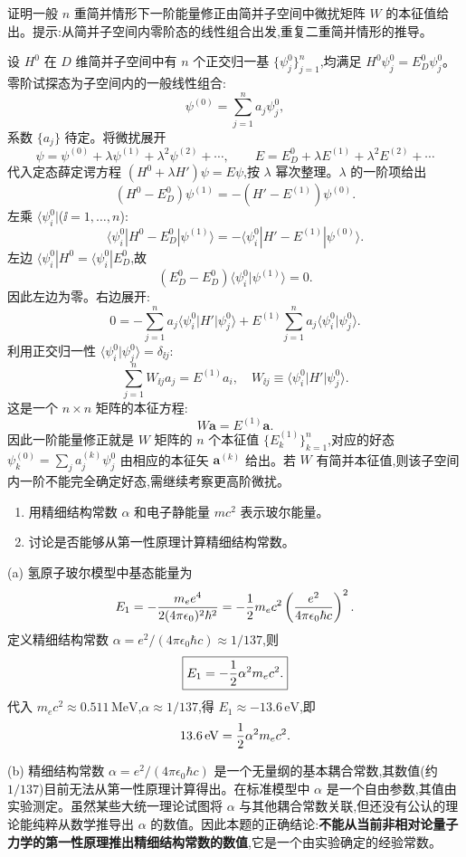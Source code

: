 \begin{question}
证明一般 $n$ 重简并情形下一阶能量修正由简并子空间中微扰矩阵 $W$ 的本征值给出。提示:从简并子空间内零阶态的线性组合出发,重复二重简并情形的推导。
\end{question}
\begin{solution}
设 $H^0$ 在 $D$ 维简并子空间中有 $n$ 个正交归一基 $\{\psi_j^0\}_{j=1}^n$,均满足 $H^0\psi_j^0=E_D^0\psi_j^0$。零阶试探态为子空间内的一般线性组合:
\[
\psi^{(0)}=\sum_{j=1}^n a_j\psi_j^0,
\]
系数 $\{a_j\}$ 待定。将微扰展开
\[
\psi=\psi^{(0)}+\lambda\psi^{(1)}+\lambda^2\psi^{(2)}+\cdots,\qquad
E=E_D^0+\lambda E^{(1)}+\lambda^2 E^{(2)}+\cdots
\]
代入定态薛定谔方程 $(H^0+\lambda H')\psi=E\psi$,按 $\lambda$ 幂次整理。$\lambda$ 的一阶项给出
\[
(H^0-E_D^0)\psi^{(1)}=-(H'-E^{(1)})\psi^{(0)}.
\]
左乘 $\langle\psi_i^0|$($\ii=1,\dots,n$):
\[
\langle\psi_i^0|H^0-E_D^0|\psi^{(1)}\rangle
=-\langle\psi_i^0|H'-E^{(1)}|\psi^{(0)}\rangle.
\]
左边 $\langle\psi_i^0|H^0=\langle\psi_i^0|E_D^0$,故
\[
(E_D^0-E_D^0)\langle\psi_i^0|\psi^{(1)}\rangle=0.
\]
因此左边为零。右边展开:
\[
0=-\sum_{j=1}^n a_j\langle\psi_i^0|H'|\psi_j^0\rangle
+E^{(1)}\sum_{j=1}^n a_j\langle\psi_i^0|\psi_j^0\rangle.
\]
利用正交归一性 $\langle\psi_i^0|\psi_j^0\rangle=\delta_{\ii j}$:
\[
\sum_{j=1}^n W_{\ii j}a_j = E^{(1)}a_i,\quad
W_{\ii j}\equiv\langle\psi_i^0|H'|\psi_j^0\rangle.
\]
这是一个 $n\times n$ 矩阵的本征方程:
\[
W\mathbf a = E^{(1)}\mathbf a.
\]
因此一阶能量修正就是 $W$ 矩阵的 $n$ 个本征值 $\{E_k^{(1)}\}_{k=1}^n$,对应的好态 $\psi_k^{(0)}=\sum_j a_j^{(k)}\psi_j^0$ 由相应的本征矢 $\mathbf a^{(k)}$ 给出。若 $W$ 有简并本征值,则该子空间内一阶不能完全确定好态,需继续考察更高阶微扰。
\end{solution}

\begin{question}
\begin{enumerate}
\item 用精细结构常数 $\alpha$ 和电子静能量 $mc^2$ 表示玻尔能量。
\item 讨论是否能够从第一性原理计算精细结构常数。
\end{enumerate}
\end{question}
\begin{solution}
(a) 氢原子玻尔模型中基态能量为
\[
E_1=-{m_ee^4\over2(4\pi\epsilon_0)^2\hbar^2}
=-{1\over2}m_ec^2\left({e^2\over4\pi\epsilon_0\hbar c}\right)^2.
\]
定义精细结构常数 $\alpha=e^2/(4\pi\epsilon_0\hbar c)\approx1/137$,则
\[
\boxed{E_1=-{1\over2}\alpha^2 m_ec^2.}
\]
代入 $m_ec^2\approx0.511\,\mathrm{MeV}$,$\alpha\approx1/137$,得 $E_1\approx-13.6\,\mathrm{eV}$,即
\[
13.6\,\mathrm{eV}={1\over2}\alpha^2m_ec^2.
\]

(b) 精细结构常数 $\alpha=e^2/(4\pi\epsilon_0\hbar c)$ 是一个无量纲的基本耦合常数,其数值(约 $1/137$)目前无法从第一性原理计算得出。在标准模型中 $\alpha$ 是一个自由参数,其值由实验测定。虽然某些大统一理论试图将 $\alpha$ 与其他耦合常数关联,但还没有公认的理论能纯粹从数学推导出 $\alpha$ 的数值。因此本题的正确结论:\textbf{不能从当前非相对论量子力学的第一性原理推出精细结构常数的数值},它是一个由实验确定的经验常数。
\end{solution}

